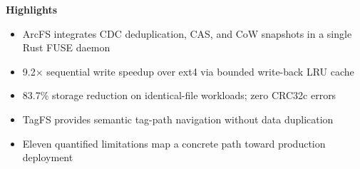 \documentclass{article}
\begin{document}
\noindent\textbf{Highlights}

\begin{itemize}
  \item ArcFS integrates CDC deduplication, CAS, and CoW snapshots in a single Rust FUSE daemon

  \item 9.2$\times$ sequential write speedup over ext4 via bounded write-back LRU cache

  \item 83.7\% storage reduction on identical-file workloads; zero CRC32c errors

  \item TagFS provides semantic tag-path navigation without data duplication

  \item Eleven quantified limitations map a concrete path toward production deployment
\end{itemize}
\end{document}
